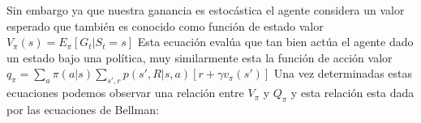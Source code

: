 \documentclass[12pt,letterpaper]{article}
\begin{document}
Sin embargo ya que nuestra ganancia es estocástica el agente considera un valor esperado que también es conocido como función de estado valor 
\newline
\newline 
$V_{\pi}(s) = E_{\pi}[G_t | S_t = s]$
\newline
\newline 
Esta ecuación evalúa que tan bien actúa el agente dado un estado bajo una política, muy similarmente esta la función de acción valor 
\newline
\newline 
$q_{\pi} = \sum\limits_a \pi(a|s) \sum\limits_{s',r} p(s',R|s,a)[r + \gamma v_{\pi}(s')]$
\newline
\newline 
Una vez determinadas estas ecuaciones podemos observar una relación entre $V_{\pi}$ y $Q_{\pi}$ y esta relación esta dada por las ecuaciones de Bellman:
\newline
\newline 
\end{document}
